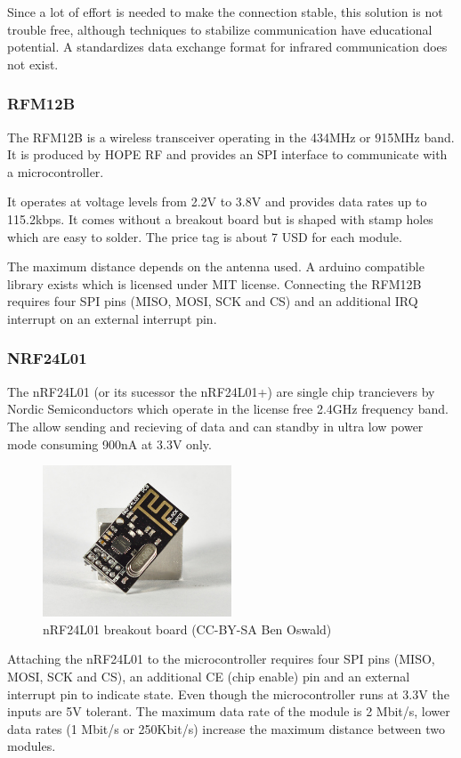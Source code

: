 \documentclass[11pt,a4paper]{article}
\begin{document}
Since a lot of effort is needed to make the connection stable, this solution is not trouble free, although techniques to stabilize communication have educational potential. A standardizes data exchange format for infrared communication does not exist.

\subsubsection{RFM12B}
The RFM12B is a wireless transceiver operating in the 434MHz or 915MHz band. It is produced by HOPE RF and provides an SPI interface to communicate with a microcontroller. 

It operates at voltage levels from 2.2V to 3.8V and provides data rates up to 115.2kbps. It comes without a breakout board but is shaped with stamp holes which are easy to solder. The price tag is about 7 USD for each module.

The maximum distance depends on the antenna used. A arduino compatible library exists which is licensed under MIT license. Connecting the RFM12B requires four SPI pins (MISO, MOSI, SCK and CS) and an additional IRQ interrupt on an external interrupt pin.
\subsubsection{NRF24L01}
The nRF24L01 (or its sucessor the nRF24L01+) are single chip trancievers by Nordic Semiconductors which operate in the license free 2.4GHz frequency band. The allow sending and recieving of data and can standby in ultra low power mode consuming 900nA at 3.3V only.

\begin{figure}[H]
  \centering
  \includegraphics[width=0.5\textwidth]{images/30_nrf24l01.jpg}
  \caption{nRF24L01 breakout board (CC-BY-SA Ben Oswald)}
\end{figure}

Attaching the nRF24L01 to the microcontroller requires four SPI pins (MISO, MOSI, SCK and CS), an additional CE (chip enable) pin and an external interrupt pin to indicate state. Even though the microcontroller runs at 3.3V the inputs are 5V tolerant. The maximum data rate of the module is 2 Mbit/s, lower data rates (1 Mbit/s or 250Kbit/s) increase the maximum distance between two modules.
\end{document}
